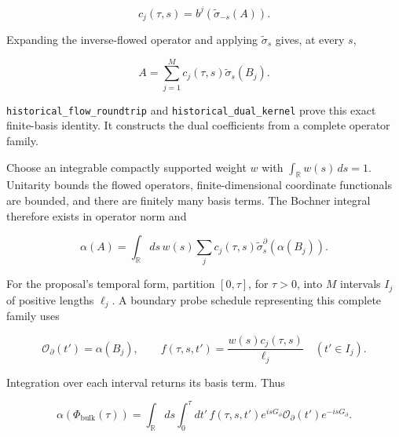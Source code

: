 \documentclass[
]{article}
\begin{document}
\[
c_j(\tau,s)=b^j\!\left(\widetilde\sigma_{-s}(A)\right).
\]

Expanding the inverse-flowed operator and applying
\(\widetilde\sigma_s\) gives, at every \(s\),

\[
A=\sum_{j=1}^M c_j(\tau,s)\widetilde\sigma_s(B_j).
\]

\texttt{h\allowbreak{}i\allowbreak{}s\allowbreak{}t\allowbreak{}o\allowbreak{}r\allowbreak{}i\allowbreak{}c\allowbreak{}a\allowbreak{}l\allowbreak{}\_\allowbreak{}f\allowbreak{}l\allowbreak{}o\allowbreak{}w\allowbreak{}\_\allowbreak{}r\allowbreak{}o\allowbreak{}u\allowbreak{}n\allowbreak{}d\allowbreak{}t\allowbreak{}r\allowbreak{}i\allowbreak{}p}
and
\texttt{h\allowbreak{}i\allowbreak{}s\allowbreak{}t\allowbreak{}o\allowbreak{}r\allowbreak{}i\allowbreak{}c\allowbreak{}a\allowbreak{}l\allowbreak{}\_\allowbreak{}d\allowbreak{}u\allowbreak{}a\allowbreak{}l\allowbreak{}\_\allowbreak{}k\allowbreak{}e\allowbreak{}r\allowbreak{}n\allowbreak{}e\allowbreak{}l}
prove this exact finite-basis identity. It constructs the dual
coefficients from a complete operator family.

Choose an integrable compactly supported weight \(w\) with
\(\int_{\mathbb{R}} w(s)\,ds=1\). Unitarity bounds the flowed operators,
finite-dimensional coordinate functionals are bounded, and there are
finitely many basis terms. The Bochner integral therefore exists in
operator norm and

\[
\alpha(A)=\int_{\mathbb R}ds\,w(s)
 \sum_j c_j(\tau,s)\widetilde\sigma_s^\partial(\alpha(B_j)).
\]

For the proposal's temporal form, partition \([0,\tau]\), for
\(\tau>0\), into \(M\) intervals \(I_j\) of positive lengths \(\ell_j\).
A boundary probe schedule representing this complete family uses

\[
\mathcal O_\partial(t')=\alpha(B_j),\qquad
f(\tau,s,t')=\frac{w(s)c_j(\tau,s)}{\ell_j}
\quad(t'\in I_j).
\]

Integration over each interval returns its basis term. Thus

\[
\alpha(\Phi_{\mathrm{bulk}}(\tau))
=\int_{\mathbb R}ds\int_0^\tau dt'\,
 f(\tau,s,t')e^{isG_\partial}\mathcal O_\partial(t')e^{-isG_\partial}.
\]
\end{document}
